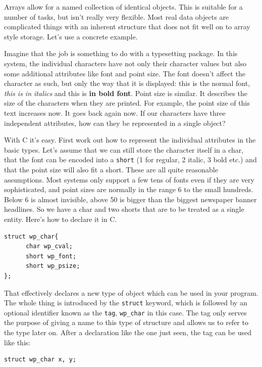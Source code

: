   

  Arrays allow for a named collection of identical objects. This is suitable
   for a number of tasks, but isn't really very flexible. Most real data
   objects are complicated things with an inherent structure that does not fit
   well on to array style storage. Let's use a concrete example.


  Imagine that the job is something to do with a typesetting package. In
    this system, the individual characters have not only their character values
    but also some additional attributes like font and point size. The font
    doesn't affect the character as such, but only the way that it is
    displayed: this is the normal font, \textit{this is in italics} and this is
    \textbf{in bold font}. Point size is similar. It describes the size of
    the characters when they are printed. For example, the point size of this
    text increases  {\large{now. It goes back again}} now.  If
    our characters have three independent attributes, how can they be
    represented in a single object?


  With C it's easy. First work out how to represent the individual
   attributes in the basic types. Let's assume that we can still store the
   character itself in a char, that the font can be encoded into
   a \texttt{short} (1 for regular, 2 italic, 3 bold etc.) and that the
   point size will also fit a short. These are all quite reasonable
   assumptions.  Most systems only support a few tens of fonts even if they are
   very sophisticated, and point sizes are normally in the range 6 to the small
   hundreds. Below 6 is almost invisible, above 50 is bigger than the biggest
   newspaper banner headlines. So we have a char and two shorts that are to be
   treated as a single entity. Here's how to declare it in C.


  \begin{Verbatim}
struct wp_char{
      char wp_cval;
      short wp_font;
      short wp_psize;
};
\end{Verbatim}

  That effectively declares a new type of object which can be used in your
   program. The whole thing is introduced by the \texttt{struct} keyword,
   which is followed by an optional identifier known as the \texttt{tag},
   \texttt{wp\_char} in this case. The tag only serves the purpose of giving
   a name to this type of structure and allows us to refer to the type later
   on.  After a declaration like the one just seen, the tag can be used like
   this:


  \begin{Verbatim}
struct wp_char x, y;
\end{Verbatim}

